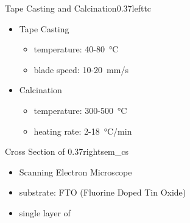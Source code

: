 \documentclass[hyperref={pdfpagelabels=false}, aspectratio=43, t]{beamer}  %
\begin{document}
\begin{graphicsFrame}{Tape Casting and Calcination}{}{0.37}{left}{tc}{}
		\vspace{1em}
		\begin{itemize}
			\item Tape Casting
				\begin{itemize}
					\item temperature: 40-80\SI{}{\degreeCelsius}
					\item blade speed: 10-20\SI{}{\milli\meter/\second}
				\end{itemize}
				\vspace{1em}
			\item Calcination
				\begin{itemize}
					\item temperature: 300-500\SI{}{\degreeCelsius}
					\item heating rate: 2-18\SI{}{\degreeCelsius/\minute}
				\end{itemize}
		\end{itemize}
\end{graphicsFrame}

\begin{graphicsFrame}{Cross Section of }{}{0.37}{right}{sem_cs}{}
	\vspace{3em}
		\begin{itemize}
			\item Scanning Electron Microscope 
			\item substrate: FTO (Fluorine Doped Tin Oxide)
			\item single layer of 
		\end{itemize}
\end{graphicsFrame}
\end{document}
